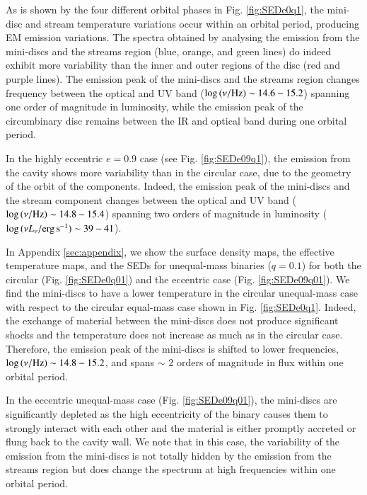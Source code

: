 \documentclass{aa}
\begin{document}
As is shown by the four different orbital phases in Fig. \ref{fig:SEDe0q1}, the mini-disc and stream temperature variations occur within an orbital period, producing EM emission variations. The spectra obtained by analysing the emission from the mini-discs and the streams region (blue, orange, and green lines) do indeed exhibit more variability than the inner and outer regions of the disc (red and purple lines). 
The emission peak of the mini-discs and the streams region changes frequency between the optical and UV band ($\log\,(\nu/\rm{Hz}) \sim 14.6-15.2 $) spanning one order of magnitude in luminosity, while the emission peak of the circumbinary disc remains between the IR and optical band during one orbital period.

In the highly eccentric $e=0.9$ case (see Fig. \ref{fig:SEDe09q1}), the emission from the cavity shows more variability than in the circular case, due to the geometry of the orbit of the components. 
Indeed, the emission peak of the mini-discs and the stream component changes between the optical and UV band ($\log\,(\nu/\rm{Hz}) \sim 14.8-15.4$) spanning two orders of magnitude in luminosity ($\log\,(\nu L_{\rm{\nu}}/{\rm erg} \, {\rm s}^{-1}) \sim 39-41$).

In Appendix \ref{sec:appendix}, we show the surface density maps, the effective temperature maps, and the SEDs for unequal-mass binaries ($q=0.1$) for both the circular (Fig. \ref{fig:SEDe0q01}) and  the eccentric case (Fig. \ref{fig:SEDe09q01}). 
We find the mini-discs to have a lower temperature in the  circular unequal-mass case with respect to the circular equal-mass case shown in Fig. \ref{fig:SEDe0q1}. Indeed, the exchange of material between the mini-discs does not produce significant shocks and the temperature does not increase as much as in the circular case. 
Therefore, the emission peak of the mini-discs is shifted to lower frequencies, $\log\,(\nu/\rm{Hz}) \sim 14.8 - 15.2$, and  spans  $\sim $ 2 orders of magnitude in flux within one orbital period. 

In the eccentric unequal-mass case (Fig. \ref{fig:SEDe09q01}), the mini-discs are significantly depleted as the high eccentricity of the binary causes them to strongly interact with each other and the material is either promptly accreted or flung back to the cavity wall. 
We note that in this case, the variability of the emission from the mini-discs is not totally hidden by the emission from the streams region but does change the spectrum at high frequencies within one orbital period. 
\end{document}
